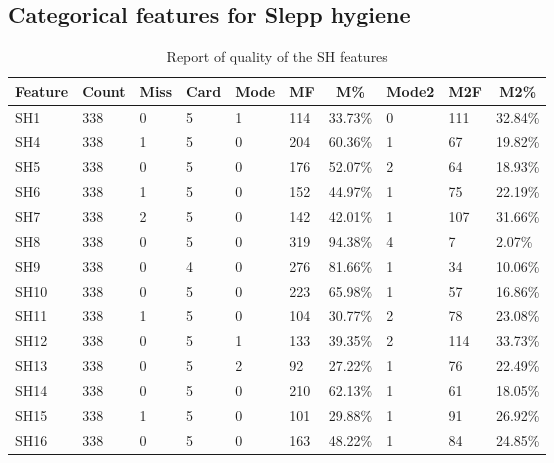 \documentclass[]{book}
\begin{document}
\subsection{Categorical features for Slepp
hygiene}\label{categorical-features-for-slepp-hygiene}

\begin{table}[ht]
\centering
\caption{Report of quality of the SH features}
\label{tab:report-of-quality-of-the-sleep-hygiene-features}
\begin{tabular}{llllllllll}
\hline
\multicolumn{1}{c}{\textbf{Feature}} & \multicolumn{1}{c}{\textbf{Count}} & \multicolumn{1}{c}{\textbf{Miss}} & \multicolumn{1}{c}{\textbf{Card}} & \multicolumn{1}{c}{\textbf{Mode}} & \multicolumn{1}{c}{\textbf{MF}} & \multicolumn{1}{c}{\textbf{M\%}} & \multicolumn{1}{c}{\textbf{Mode2}} & \multicolumn{1}{c}{\textbf{M2F}} & \multicolumn{1}{c}{\textbf{M2\%}} \\
\hline
SH1    & 338    & 0   & 5  & 1     & 114   & 33.73\%   & 0   & 111  & 32.84\%  \\
SH4    & 338    & 1   & 5  & 0     & 204   & 60.36\%   & 1   & 67   & 19.82\%  \\
SH5    & 338    & 0   & 5  & 0     & 176   & 52.07\%   & 2   & 64   & 18.93\%  \\
SH6    & 338    & 1   & 5  & 0     & 152   & 44.97\%   & 1   & 75   & 22.19\%  \\
SH7    & 338    & 2   & 5  & 0     & 142   & 42.01\%   & 1   & 107  & 31.66\%  \\
SH8    & 338    & 0   & 5  & 0     & 319   & 94.38\%   & 4   & 7    & 2.07\%   \\
SH9    & 338    & 0   & 4  & 0     & 276   & 81.66\%   & 1   & 34   & 10.06\%  \\
SH10   & 338    & 0   & 5  & 0     & 223   & 65.98\%   & 1   & 57   & 16.86\%  \\
SH11   & 338    & 1   & 5  & 0     & 104   & 30.77\%   & 2   & 78   & 23.08\%  \\
SH12   & 338    & 0   & 5  & 1     & 133   & 39.35\%   & 2   & 114  & 33.73\%  \\
SH13   & 338    & 0   & 5  & 2     & 92    & 27.22\%   & 1   & 76   & 22.49\%  \\
SH14   & 338    & 0   & 5  & 0     & 210   & 62.13\%   & 1   & 61   & 18.05\%  \\
SH15   & 338    & 1   & 5  & 0     & 101   & 29.88\%   & 1   & 91   & 26.92\%  \\
SH16   & 338    & 0   & 5  & 0     & 163   & 48.22\%   & 1   & 84   & 24.85\%  \\

\end{tabular}
\end{table}
\end{document}
